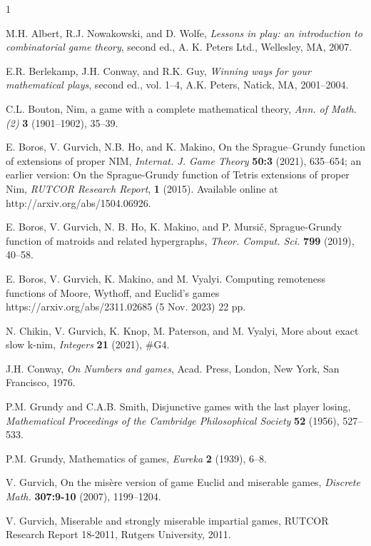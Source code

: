 \documentclass[10pt]{article}
\theoremstyle{definition}
\begin{document}
\begin{thebibliography}{1}\footnotesize
  
M.H. Albert, R.J. Nowakowski, and D. Wolfe,
{\it Lessons in play: an introduction to combinatorial game theory},
second ed., A. K. Peters Ltd., Wellesley, MA, 2007.

E.R. Berlekamp, J.H. Conway, and R.K. Guy, 
{\it Winning ways for your mathematical plays}, second ed., vol. 1–4, 
A.K. Peters, Natick, MA, 2001--2004.

C.L. Bouton, Nim, a game with a complete mathematical theory,
{\it Ann. of Math. (2)}  {\bf3} (1901--1902), 35--39.

E. Boros, V. Gurvich, N.B. Ho, and K. Makino,
On the Sprague--Grundy function of extensions of proper NIM,
{\it Internat. J. Game Theory} {\bf 50:3} (2021), 635--654;
an earlier version: 
On the Sprague-Grundy function of Tetris extensions of proper {\sc Nim},
{\it RUTCOR Research Report}, {\bf 1} (2015).  Available online at
http://arxiv.org/abs/1504.06926. 

E. Boros, V. Gurvich, N. B. Ho, K. Makino, and  P. Mursi\v{c}, 
Sprague-Grundy function of matroids and related hypergraphs, 
{\it Theor. Comput. Sci.} {\bf799} (2019), 40--58. 

E. Boros, V. Gurvich, K. Makino, and M. Vyalyi.
Computing remoteness functions 
of Moore, Wythoff, and Euclid's games
https://arxiv.org/abs/2311.02685 (5 Nov. 2023) 22 pp.

N. Chikin, V. Gurvich, K. Knop, 
M. Paterson, and M. Vyalyi, 
More about exact slow k-nim, 
{\it Integers} {\bf 21} (2021), \#G4.   

J.H. Conway, {\it On Numbers and games}, Acad. Press, 
London, New York, San Francisco, 1976.

P.M. Grundy and C.A.B. Smith, 
Disjunctive games with the last player losing, 
{\it Mathematical Proceedings of 
the Cambridge Philosophical Society} 
{\bf52} (1956), 527--533.

P.M. Grundy, Mathematics of games, {\it Eureka} {\bf2} (1939), 6--8.

V. Gurvich, 
On the mis\`{e}re version of game Euclid and miserable games, 
{\it Discrete Math.} {\bf 307:9-10} (2007), 1199--1204.

 V. Gurvich, 
Miserable and strongly miserable impartial games, 
RUTCOR Research Report 18-2011, Rutgers University, 2011.


\end{thebibliography}
\end{document}
